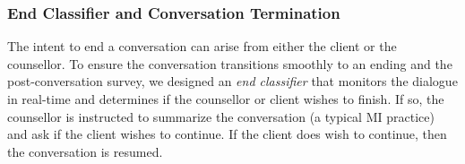\subsubsection{End Classifier and Conversation Termination}
The intent to end a conversation can arise from either the client or the counsellor. To ensure the conversation transitions smoothly to an ending and the post-conversation survey, we designed an \textit{end classifier} that monitors the dialogue in real-time and determines if the counsellor or client wishes to finish. If so, the counsellor is instructed to summarize the conversation (a typical MI practice) and ask if the client wishes to continue. If the client does wish to continue, then the conversation is resumed.
